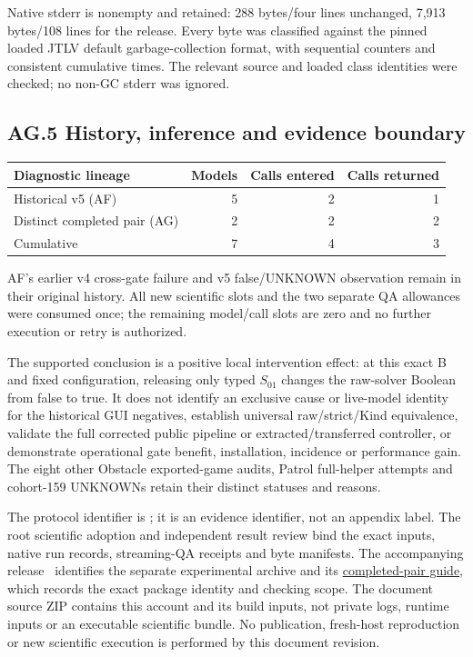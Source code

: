 Native stderr is nonempty and retained: 288 bytes/four lines unchanged,
7,913 bytes/108 lines for the release. Every byte was classified against
the pinned loaded JTLV default garbage-collection format, with sequential
counters and consistent cumulative times. The relevant source and loaded
class identities were checked; no non-GC stderr was ignored.

\subsection*{AG.5 History, inference and evidence boundary}
\begin{center}\small
\begin{tabular}{@{}L{68mm}rrr@{}}\toprule
Diagnostic lineage & Models & Calls entered & Calls returned\\\midrule
Historical v5 (AF) & 5 & 2 & 1\\
Distinct completed pair (AG) & 2 & 2 & 2\\
Cumulative & 7 & 4 & 3\\\bottomrule
\end{tabular}
\end{center}
AF's earlier v4 cross-gate failure and v5 false/UNKNOWN observation
remain in their original history. All new scientific slots and the two
separate QA allowances were consumed once; the remaining model/call
slots are zero and no further execution or retry is authorized.

The supported conclusion is a positive local intervention effect: at
this exact B and fixed configuration, releasing only typed $S_{01}$
changes the raw-solver Boolean from false to true. It does not identify
an exclusive cause or live-model identity for the historical GUI
negatives, establish universal raw/strict/Kind equivalence, validate the
full corrected public pipeline or extracted/transferred controller,
or demonstrate operational gate benefit, installation, incidence or
performance gain. The eight other Obstacle exported-game audits,
Patrol full-helper attempts and cohort-159 UNKNOWNs retain their distinct
statuses and reasons.

The protocol identifier is
; it is an evidence
identifier, not an appendix label. The root scientific adoption and
independent result review bind the exact inputs, native run records,
streaming-QA receipts and byte manifests. The accompanying
release~\cite{artifactrepository} identifies the separate experimental archive
and its \href{https://github.com/research-artifact-archive/seams2027/blob/controller-replacement-audit-20261026-v10/results/guides/COMPLETED_SAME_OBSERVER_PAIR.md}{completed-pair guide},
which records the exact package identity and checking scope.
The document source ZIP contains this account and its build inputs,
not private logs, runtime inputs or an executable scientific bundle.
No publication, fresh-host reproduction or new scientific execution
is performed by this document revision.
